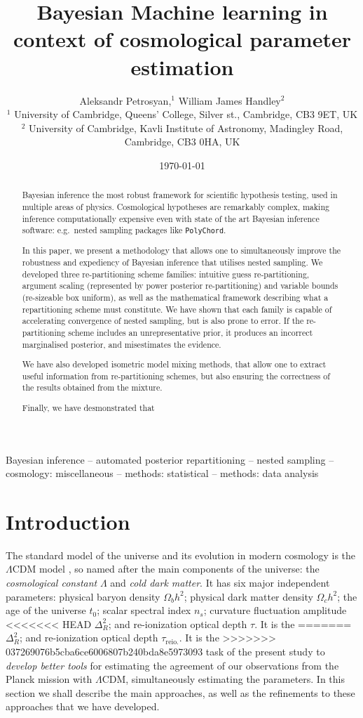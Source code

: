 \documentclass[usenatbib]{mnras}
\author[A. Petrosyan and W. J. Handley]{
  Aleksandr Petrosyan,$^{1}$
  William James Handley$^{2}$
  \\
  $^{1}$ University of Cambridge, Queens' College, Silver st., Cambridge, CB3 9ET, UK\\
  $^{2}$ University of Cambridge, Kavli Institute of Astronomy, Madingley Road, Cambridge, CB3 0HA, UK 
}
\date{\today}
\title[Accelerated Bayesian inference]{Bayesian Machine learning in context of cosmological parameter estimation}
\begin{document}
\maketitle
\begin{abstract}
  Bayesian inference the most robust framework for scientific
  hypothesis testing, used in multiple areas of physics. Cosmological
  hypotheses are remarkably complex, making inference computationally
  expensive even with state of the art Bayesian inference software:
  e.g.~nested sampling packages like \texttt{PolyChord}.

  In this paper, we present a methodology that allows one to
  simultaneously improve the robustness and expediency of Bayesian
  inference that utilises nested sampling. We developed three
  re-partitioning scheme families: intuitive guess re-partitioning,
  argument scaling (represented by power posterior re-partitioning)
  and variable bounds (re-sizeable box uniform), as well as the
  mathematical framework describing what a repartitioning scheme must
  constitute. We have shown that each family is capable of
  accelerating convergence of nested sampling, but is also prone to
  error. If the re-partitioning scheme includes an unrepresentative
  prior, it produces an incorrect marginalised posterior, and
  misestimates the evidence.

  We have also developed isometric model mixing methods, that allow
  one to extract useful information from re-partitioning schemes, but
  also ensuring the correctness of the results obtained from the
  mixture.

  Finally, we have desmonstrated that 
\end{abstract}

\begin{keywords}
Bayesian inference -- automated posterior repartitioning -- nested sampling -- cosmology: miscellaneous -- methods: statistical -- methods: data analysis
\end{keywords}

\section{Introduction}\label{sec:org14413d7}

The standard model of the universe and its evolution in modern
cosmology is the \(\Lambda\)CDM model \citep{Condon2018}, so named
after the main components of the universe: the \emph{cosmological constant} \(\Lambda\)
and \emph{cold dark matter}. It has six major independent parameters:
physical baryon density \(\Omega_{b}h^{2}\); physical dark matter
density \(\Omega_{c}h^{2}\); the age of the universe \(t_{0}\); scalar
spectral index \(n_{s}\); curvature fluctuation amplitude
<<<<<<< HEAD
\(\Delta_{R}^{2}\); and re-ionization optical depth \(\tau\). It is the
=======
\(\Delta_{R}^{2}\); and re-ionization optical depth \(\tau_\text{reio.}\). It is the
>>>>>>> 037269076b5cba6ce6006807b240bda8e5973093
task of the present study to \emph{develop better tools} for estimating
the agreement of our observations from the Planck mission with
\(\Lambda\)CDM, simultaneously estimating the parameters. In this
section we shall describe the main approaches, as well as the
refinements to these approaches that we have developed.
\end{document}
